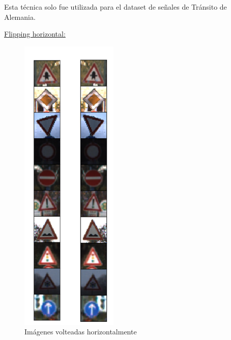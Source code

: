 			Esta técnica solo fue utilizada para el dataset de señales de Tránsito de Alemania.
			
			\begin{multicols}{2}
				
				\underline{Flipping horizontal:}
				\begin{figure}[H]
					\begin{center}
					\includegraphics[height=14.5cm ]{images/desarrollo/Augment/flippedHorizontally}
					\end{center}
					\begin{center}
					\caption{\small{Imágenes volteadas horizontalmente}}
					\vspace{-1em}
				{\small{\fontsize{10}{16.8}\selectfont {Fuente propia}}}
					\end{center}
					\vspace{-1.5em}
				\end{figure}

			

\end{multicols}
